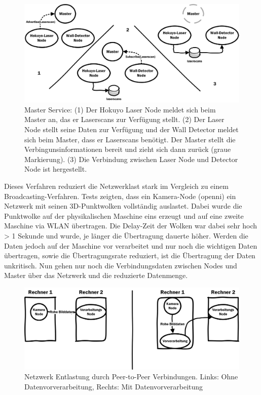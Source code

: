  \begin{figure}[h]
 	\centering
 	\includegraphics[scale=0.8]{fig/masternode}   
 	\caption[Master Service]{Master Service: (1) Der Hokuyo Laser Node meldet sich beim Master an, das er Laserscans zur Verfügung stellt. (2) Der Laser Node stellt seine Daten zur Verfügung und der Wall Detector meldet sich beim Master, dass er Laserscans benötigt. Der Master stellt die Verbingunsinformationen bereit und zieht sich dann zurück (graue Markierung). (3) Die Verbindung zwischen Laser Node und Detector Node ist hergestellt.}
 	\label{fig:basic-ros-masternode}
 \end{figure}
 
 Dieses Verfahren reduziert die Netzwerklast stark im Vergleich zu einem Broadcasting-Verfahren. Tests zeigten, dass ein Kamera-Node (openni) ein Netzwerk mit seinen 3D-Punktwolken vollständig auslastet. Dabei wurde die Punktwolke auf der physikalischen Maschine eins erzeugt und auf eine zweite Maschine via WLAN übertragen. Die Delay-Zeit der Wolken war dabei sehr hoch > 1 Sekunde und wurde, je länger die Übertragung dauerte höher. Werden die Daten jedoch auf der Maschine vor verarbeitet und nur noch die wichtigen Daten übertragen, sowie die Übertragungsrate reduziert, ist die Übertragung der Daten unkritisch. Nun gehen nur noch die Verbindungsdaten zwischen Nodes und Master über das Netzwerk und die reduzierte Datenmenge.
 
 \begin{figure}[h]
 	\centering
 	\includegraphics[scale=0.8]{fig/masternet}   
 	\caption[Netzwerk Entlastung durch Peer-to-Peer Verbindungen]{Netzwerk Entlastung durch Peer-to-Peer Verbindungen. Links: Ohne Datenvorverarbeitung, Rechts: Mit Datenvorverarbeitung}
 	\label{fig:basic-ros-masternet}
 \end{figure}
 
